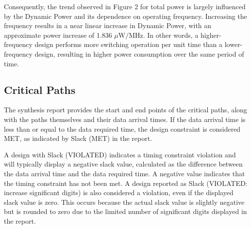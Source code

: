 \documentclass[a4paper,11pt]{article}
\begin{document}
Consequently, the trend observed in Figure 2 for total power is largely influenced by the Dynamic Power and its dependence on operating frequency. Increasing the frequency results in a near linear increase in Dynamic Power, with an approximate power increase of 1.836 $\mu\text{W}/\text{MHz}$. In other words, a higher-frequency design performs more switching operation per unit time than a lower-frequency design, resulting in higher power consumption over the same period of time. 


\subsection{Critical Paths}

The synthesis report provides the start and end points of the critical paths, along with the paths themselves and their data arrival times. If the data arrival time is less than or equal to the data required time, the design constraint is considered MET, as indicated by Slack (MET) in the report.

A design with Slack (VIOLATED) indicates a timing constraint violation and will typically display a negative slack value, calculated as the difference between the data arrival time and the data required time. A negative value indicates that the timing constraint has not been met. A design reported as Slack (VIOLATED: increase significant digits) is also considered a violation, even if the displayed slack value is zero. This occurs because the actual slack value is slightly negative but is rounded to zero due to the limited number of significant digits displayed in the report.
\end{document}
